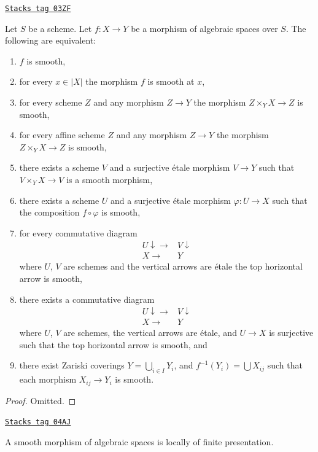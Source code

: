 \begin{lemma}
\label{spaces-morphisms-lemma-smooth-local}
\href{https://stacks.math.columbia.edu/tag/03ZF}{\texttt{Stacks tag 03ZF}}

Let $S$ be a scheme.
Let $f : X \to Y$ be a morphism of algebraic spaces over $S$.
The following are equivalent:
\begin{enumerate}
\item $f$ is smooth,
\item for every $x \in |X|$ the morphism $f$ is smooth at $x$,
\item for every scheme $Z$ and any morphism $Z \to Y$ the morphism
$Z \times_Y X \to Z$ is smooth,
\item for every affine scheme $Z$ and any morphism
$Z \to Y$ the morphism $Z \times_Y X \to Z$ is smooth,
\item there exists a scheme $V$ and a surjective \'etale morphism
$V \to Y$ such that $V \times_Y X \to V$ is a smooth morphism,
\item there exists a scheme $U$ and a surjective \'etale morphism
$\varphi : U \to X$ such that the composition $f \circ \varphi$
is smooth,
\item for every commutative diagram
$$
\begin{array}{cc}U \downarrow\longrightarrow & V \downarrow \\ X \longrightarrow & Y\end{array}
$$
where $U$, $V$ are schemes and the vertical arrows are \'etale
the top horizontal arrow is smooth,
\item there exists a commutative diagram
$$
\begin{array}{cc}U \downarrow\longrightarrow & V \downarrow \\ X \longrightarrow & Y\end{array}
$$
where $U$, $V$ are schemes, the vertical arrows are \'etale, and $U \to X$ is
surjective such that the top horizontal arrow is smooth, and
\item there exist Zariski coverings $Y = \bigcup_{i \in I} Y_i$,
and $f^{-1}(Y_i) = \bigcup X_{ij}$ such that
each morphism $X_{ij} \to Y_i$ is smooth.
\end{enumerate}
\end{lemma}

\begin{proof}
Omitted.
\end{proof}

\begin{lemma}
\label{spaces-morphisms-lemma-smooth-locally-finite-presentation}
\href{https://stacks.math.columbia.edu/tag/04AJ}{\texttt{Stacks tag 04AJ}}

A smooth morphism of algebraic spaces is locally of finite presentation.
\end{lemma}

